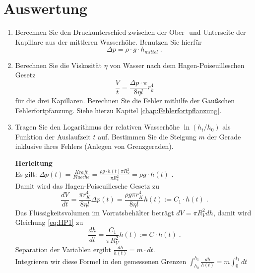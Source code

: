 \section{Auswertung} 
\begin{enumerate}
 \item Berechnen Sie den Druckunterschied zwischen der Ober- und Unterseite der Kapillare aus der mittleren Wasserhöhe. Benutzen Sie hierfür
  \begin{equation}
		\Delta p = \rho\cdot g\cdot h_{mittel}\; .  
  \end{equation}
 \item \label{Aufg:Vis1}
 Berechnen Sie die Viskosität $\eta$ von Wasser nach dem Hagen-Poiseuilleschen Gesetz
  \begin{equation} \label{eq:HP}
   \frac{V}{t} = \frac{\Delta p\cdot\pi}{8\eta l}r_k^4
  \end{equation}
 für die drei Kapillaren. Berechnen Sie die Fehler mithilfe der Gaußschen Fehlerfortpfanzung. Siehe hierzu Kapitel \ref{chap:Fehlerfortpflanzung}.
 \item Tragen Sie den Logarithmus der relativen Wasserhöhe $\ln(h_i/h_0)$ als Funktion der Auslaufzeit $t$ auf. Bestimmen Sie die Steigung $m$ der Gerade inklusive ihres Fehlers (Anlegen von Grenzgeraden).\\
	\begin{hint}
	\textbf{Herleitung}\\
	Es gilt: $\Delta p(t) = \frac{Kraft}{Flaeche} = \frac{\rho g\cdot h(t) \pi R_V^2}{\pi R_V^2} = \rho g\cdot h(t)$\; .\\
	Damit wird das Hagen-Poiseuillesche Gesetz zu 
	\begin{equation} \label{eq:HP1}
		\frac{dV}{dt} = \frac{\pi r_K^4}{8\eta l}\Delta p(t) = \frac{\rho g\pi r_K^4}{8\eta l} h(t) := C_1\cdot h(t)\; .
	\end{equation}
	Das Flüssigkeitsvolumen im Vorratsbehälter beträgt $dV = \pi R_V^2 dh$, damit wird Gleichung \ref{eq:HP1} zu
	\begin{equation}
		\frac{dh}{dt} = \frac{C_1}{\pi R_V^2} h(t) := C\cdot h(t)\; .
	\end{equation}
	Separation der Variablen ergibt $\frac{dh}{h(t)} = m\cdot dt$.\\
	Integrieren wir diese Formel in den gemessenen Grenzen $\int^{h_1}_{h_0} \frac{dh}{h(t)} = m\int^{t_1}_0 dt$\\

\end{hint}
\end{enumerate}
